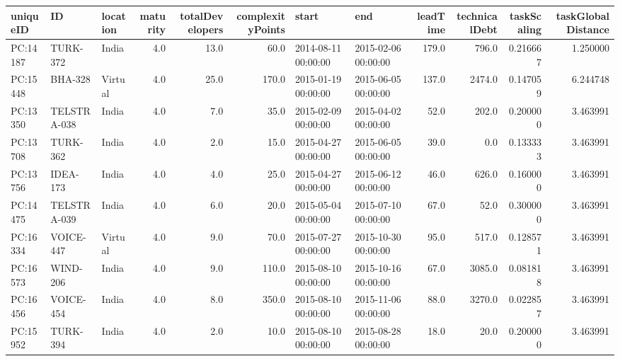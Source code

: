 \begin{tabular}{lllrrrllrrrr}
\toprule
 uniqueID &           ID & location &  maturity &  totalDevelopers &  complexityPoints &                start &                  end &  leadTime &  technicalDebt &  taskScaling &  taskGlobalDistance \\
\midrule
 PC:14187 &     TURK-372 &    India &       4.0 &             13.0 &              60.0 &  2014-08-11 00:00:00 &  2015-02-06 00:00:00 &     179.0 &          796.0 &     0.216667 &            1.250000 \\
 PC:15448 &      BHA-328 &  Virtual &       4.0 &             25.0 &             170.0 &  2015-01-19 00:00:00 &  2015-06-05 00:00:00 &     137.0 &         2474.0 &     0.147059 &            6.244748 \\
 PC:13350 &  TELSTRA-038 &    India &       4.0 &              7.0 &              35.0 &  2015-02-09 00:00:00 &  2015-04-02 00:00:00 &      52.0 &          202.0 &     0.200000 &            3.463991 \\
 PC:13708 &     TURK-362 &    India &       4.0 &              2.0 &              15.0 &  2015-04-27 00:00:00 &  2015-06-05 00:00:00 &      39.0 &            0.0 &     0.133333 &            3.463991 \\
 PC:13756 &     IDEA-173 &    India &       4.0 &              4.0 &              25.0 &  2015-04-27 00:00:00 &  2015-06-12 00:00:00 &      46.0 &          626.0 &     0.160000 &            3.463991 \\
 PC:14475 &  TELSTRA-039 &    India &       4.0 &              6.0 &              20.0 &  2015-05-04 00:00:00 &  2015-07-10 00:00:00 &      67.0 &           52.0 &     0.300000 &            3.463991 \\
 PC:16334 &    VOICE-447 &  Virtual &       4.0 &              9.0 &              70.0 &  2015-07-27 00:00:00 &  2015-10-30 00:00:00 &      95.0 &          517.0 &     0.128571 &            3.463991 \\
 PC:16573 &     WIND-206 &    India &       4.0 &              9.0 &             110.0 &  2015-08-10 00:00:00 &  2015-10-16 00:00:00 &      67.0 &         3085.0 &     0.081818 &            3.463991 \\
 PC:16456 &    VOICE-454 &    India &       4.0 &              8.0 &             350.0 &  2015-08-10 00:00:00 &  2015-11-06 00:00:00 &      88.0 &         3270.0 &     0.022857 &            3.463991 \\
 PC:15952 &     TURK-394 &    India &       4.0 &              2.0 &              10.0 &  2015-08-10 00:00:00 &  2015-08-28 00:00:00 &      18.0 &           20.0 &     0.200000 &            3.463991 \\

\end{tabular}
